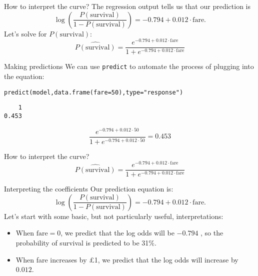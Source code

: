 \documentclass{beamer}\usepackage[]{graphicx}\usepackage[]{color}
\makeatletter
\newcommand{\hlnum}[1]{\textcolor[rgb]{0.824,0.412,0.118}{#1}}%
\newcommand{\hlstr}[1]{\textcolor[rgb]{1,0.894,0.71}{#1}}%
\newcommand{\hlstd}[1]{\textcolor[rgb]{1,0.894,0.769}{#1}}%
\newcommand{\hlkwc}[1]{\textcolor[rgb]{0.78,0.941,0.545}{#1}}%
\newcommand{\hlkwd}[1]{\textcolor[rgb]{1,0.78,0.769}{#1}}%
\newenvironment{kframe}{%
 \def\at@end@of@kframe{}%
 \ifinner\ifhmode%
  \def\at@end@of@kframe{\end{minipage}}%
  \begin{minipage}{\columnwidth}%
 \fi\fi%
 \def\FrameCommand##1{\hskip\@totalleftmargin \hskip-\fboxsep
 \colorbox{shadecolor}{##1}\hskip-\fboxsep
     \hskip-\linewidth \hskip-\@totalleftmargin \hskip\columnwidth}%
 \MakeFramed {\advance\hsize-\width
   \@totalleftmargin\z@ \linewidth\hsize
   \@setminipage}}%
 {\par\unskip\endMakeFramed%
 \at@end@of@kframe}
\newenvironment{knitrout}{}{} %
\makeatother
\begin{document}
\begin{darkframes}
\begin{frame}{How to interpret the curve?}
      The regression output tells us that our prediction is
      \[
        \log\left(\frac{P(\text{survival})}{1-P(\text{survival})}\right) = -0.794 + 0.012\cdot\text{fare}.
      \]
      \pause
      Let's solve for $P(\text{survival})$:
      \[
        \widehat{P(\text{survival})} = \frac{e^{-0.794 + 0.012\cdot\text{fare}}}{1 + e^{-0.794 + 0.012\cdot\text{fare}}}
      \]
      \lc
    \end{frame}

    \begin{frame}[fragile]{Making predictions}
      We can use \texttt{predict} to automate the process of plugging into the equation:
\begin{knitrout}
\begin{kframe}
\begin{alltt}
\hlkwd{predict}\hlstd{(model,} \hlkwd{data.frame}\hlstd{(}\hlkwc{fare}\hlstd{=}\hlnum{50}\hlstd{),} \hlkwc{type}\hlstd{=}\hlstr{"response"}\hlstd{)}
\end{alltt}
\begin{verbatim}
    1 
0.453 
\end{verbatim}
\end{kframe}
\end{knitrout}
      
      \[
        \frac{e^{-0.794 + 0.012\cdot 50}}{1 + e^{-0.794 + 0.012\cdot 50}} = 0.453
      \]
    \end{frame}

    \begin{frame}[fragile]{How to interpret the curve?}
      \[
        \widehat{P(\text{survival})} = \frac{e^{-0.794 + 0.012\cdot\text{fare}}}{1 + e^{-0.794 + 0.012\cdot\text{fare}}}
      \]
\begin{knitrout}


\end{knitrout}
    \end{frame}

    \begin{frame}{Interpreting the coefficients}
      Our prediction equation is:
      \[
        \log\left(\frac{P(\text{survival})}{1-P(\text{survival})}\right) = -0.794 + 0.012\cdot\text{fare}.
      \]
      Let's start with some basic, but not particularly useful, interpretations:
      \begin{itemize}[<+->]
        \item When $\text{fare}=0$, we predict that the log odds will be $-0.794$ \pause, so the probability of survival is predicted to be 31\%.
        \item When fare increases by \pounds 1, we predict that the log odds will increase by $0.012$.
      \end{itemize}
    \end{frame}


\end{darkframes}
\end{document}
